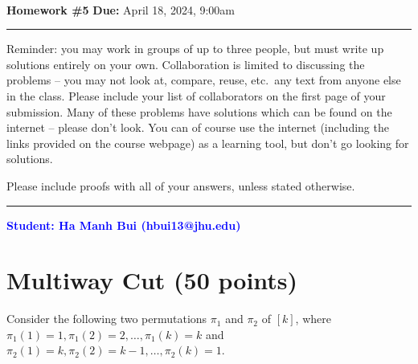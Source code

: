 \documentclass[11pt]{article}
\begin{document}
\\
{{\bf Homework \#5}} \hfill {{\bf Due:} April 18, 2024, 9:00am} \\
\rule[0.1in]{\textwidth}{0.4pt}

Reminder: you may work in groups of up to three people, but must write up solutions entirely on your own.  Collaboration is limited to discussing the problems -- you may not look at, compare, reuse, etc.~any text from anyone else in the class.  Please include your list of collaborators on the first page of your submission.  Many of these problems have solutions which can be found on the internet -- please don't look.  You can of course use the internet (including the links provided on the course webpage) as a learning tool, but don't go looking for solutions.  

Please include proofs with all of your answers, unless stated otherwise.

\noindent \rule[0.1in]{\textwidth}{0.4pt}

\begin{center}
    \textbf{\textcolor{blue}{Student: Ha Manh Bui (hbui13@jhu.edu)}}
\end{center}

\section{Multiway Cut (50 points)}
Consider the following two permutations $\pi_1$ and $\pi_2$ of $[k]$, where $\pi_1(1) = 1, \pi_1(2) = 2, \dots, \pi_1(k) = k$ and $\pi_2(1) = k, \pi_2(2) = k-1, \dots, \pi_2(k) = 1$.  
\end{document}
